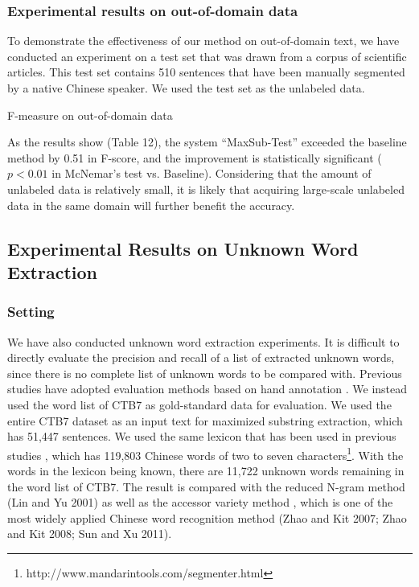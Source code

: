\documentclass[english]{jnlp_1.4}
\begin{document}
\subsubsection{Experimental results on out-of-domain data}

To demonstrate the effectiveness of our method on out-of-domain text, we have conducted an experiment on a test set that was drawn from a corpus of scientific articles. This test set contains 510 sentences that have been manually segmented by a native Chinese speaker. We used the test set as the unlabeled data. 

\begin{table}[t]
\caption{F-measure on out-of-domain data}

\end{table}

As the results show (Table 12), the system ``MaxSub-Test'' exceeded the baseline method by 0.51 in F-score, and the improvement is statistically significant ($p<0.01$ in McNemar's test vs. Baseline). Considering that the amount of unlabeled data is relatively small, it is likely that acquiring large-scale unlabeled data in the same domain will further benefit the accuracy.


\subsection{Experimental Results on Unknown Word Extraction}

\subsubsection{Setting}

We have also conducted unknown word extraction experiments. It is difficult to directly evaluate the precision and recall of a list of extracted unknown words, since there is no complete list of unknown words to be compared with. Previous studies have adopted evaluation methods based on hand annotation \cite{feng2004accessor,zhang2011extract}. We instead used the word list of CTB7 as gold-standard data for evaluation. We used the entire CTB7 dataset as an input text for maximized substring extraction, which has 51,447 sentences. We used the same lexicon that has been used in previous studies \cite{feng2004accessor,zhang2011extract}, which has 119,803 Chinese words of two to seven characters\footnote{http://www.mandarintools.com/segmenter.html}. With the words in the lexicon being known, there are 11,722 unknown words remaining in the word list of CTB7. The result is compared with the reduced N-gram method (Lin and Yu 2001) as well as the accessor variety method \cite{feng2004accessor}, which is one of the most widely applied Chinese word recognition method (Zhao and Kit 2007; Zhao and Kit 2008; Sun and Xu 2011). 
\end{document}
